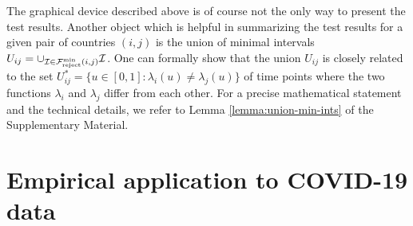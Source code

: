 \documentclass[a4paper,12pt]{article}
\numberwithin{equation}{section}
\begin{document}
{\color{red}
The graphical device described above is of course not the only way to present the test results. Another object which is helpful in summarizing the test results for a given pair of countries $(i,j)$ is the union of minimal intervals $U_{ij} = \cup_{\mathcal{I} \in \mathcal{F}_{\text{reject}}^{\text{min}}(i,j)} \mathcal{I}$. One can formally show that the union $U_{ij}$ is closely related to the set $U_{ij}^* = \{ u \in [0,1]: \lambda_i(u) \ne \lambda_j(u) \}$ of time points where the two functions $\lambda_i$ and $\lambda_j$ differ from each other. For a precise mathematical statement and the technical details, we refer to Lemma \ref{lemma:union-min-ints} of the Supplementary Material. 
}



\section{Empirical application to COVID-19 data}\label{sec:empirics} 
\end{document}
